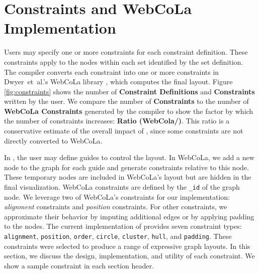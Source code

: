 \section{\projectname Constraints and WebCoLa Implementation}
\label{sec:constraints}
Users may specify one or more constraints for each constraint definition.
These constraints apply to the nodes within each set identified by the set definition.
The \projectname compiler converts each \projectname constraint into one or more
constraints in Dwyer~et~al.'s WebCoLa library \cite{WebCoLa}, which computes
the final layout. Figure \ref{fig:constraints} shows the number
of \textbf{Constraint Definitions} and \textbf{\projectname Constraints} written
by the user. We compare the number of \textbf{\projectname Constraints} to
the number of \textbf{WebCoLa Constraints} generated by the \projectname compiler
to show the factor by which the number of constraints increases: \textbf{Ratio
(WebCola/\projectname)}. This ratio is a conservative estimate of the
overall impact of \projectname, since some \projectname constraints are not
directly converted to WebCoLa.

In \projectname, the user may define guides to control the layout.
In WebCoLa, we add a new node to the graph for each guide and generate 
constraints relative to this node. These temporary nodes are included in 
WebCoLa's layout but are hidden in the final visualization.
WebCoLa constraints are defined by the \texttt{\_id} of the graph 
node. We leverage two of WebCoLa's constraints for our implementation: 
\emph{alignment} constraints and \emph{position} constraints. For other \projectname constraints, we
approximate their behavior by imputing additional edges or by applying
padding to the nodes. The current implementation of
\projectname provides seven constraint types:
\texttt{alignment}, \texttt{position}, \texttt{order}, \texttt{circle},
\texttt{cluster}, \texttt{hull}, and \texttt{padding}. These constraints
were selected to produce a range of expressive
graph layouts. In this section, we discuss the design, implementation, 
and utility of each \projectname constraint. We show 
a sample \projectname constraint in each section header.


